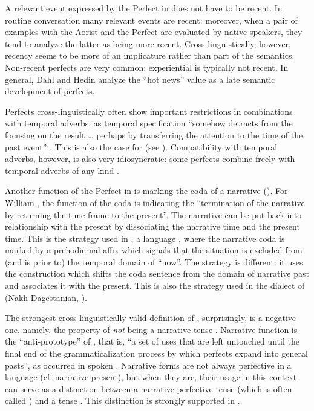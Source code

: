 \documentclass[output=paper,newtxmath,modfonts,nonflat,hidelinks]{langsci/langscibook}
\begin{document}
A relevant event expressed by the Perfect in  does not have to be recent. In routine conversation many relevant events are recent: moreover, when a pair of examples with the Aorist and the Perfect are evaluated by native speakers, they tend to analyze the latter as being more recent. Cross-linguistically, however, recency seems to be more of an implicature rather than part of the semantics. Non-recent perfects are very common: experiential  is typically not recent. In general, Dahl and Hedin \citep{khachdahlhedin2000} analyze the ``hot news'' value as a late semantic development of perfects.

Perfects cross-linguistically often show important restrictions in combinations with temporal adverbs, as temporal specification ``somehow detracts from the focusing on the  result {\ldots} perhaps by transferring the attention to the time of the past event'' \citep[395]{khachdahlhedin2000}. This is also the case for  (see ). Compatibility with temporal adverbs, however, is also very idiosyncratic: some perfects combine freely with temporal adverbs of any kind \citep{khachmaisak2016}. 

Another function of the Perfect in  is marking the coda of a narrative (). For William \citet[65]{khachlabov2001}, the function of the coda is indicating the “termination of the narrative by returning the time frame to the present”. The narrative can be put back into relationship with the present by dissociating the narrative time and the present time. This is the strategy used in , a  language \citep{khachcrane2015}, where the narrative coda is marked by a prehodiernal affix which signals that the situation is excluded from (and is prior to) the temporal domain of ``now''. The  strategy is different: it uses the  construction which shifts the coda sentence from the domain of narrative past and associates it with the present. This is also the strategy used in the  dialect of  (Nakh-Dagestanian, \citealt{khachmaisak2016}).%


The strongest cross-linguistically valid definition of , surprisingly, is a negative one, namely, the property of \textit{not} being a narrative tense \citep{khachlind2000}. Narrative function is the ``anti-prototype'' of , that is, ``a set of uses that are left untouched until the final end of the grammaticalization process by which perfects expand into general pasts'', as occurred in spoken  \citep[280]{khachdahl2014}. Narrative forms are not always perfective in a language (cf. narrative present), but when they are, their usage in this context can serve as a distinction between a narrative perfective tense (which is often called ) and a  tense \citep[cf.][]{khachmaisak2016}. This distinction is strongly supported in .
\end{document}
